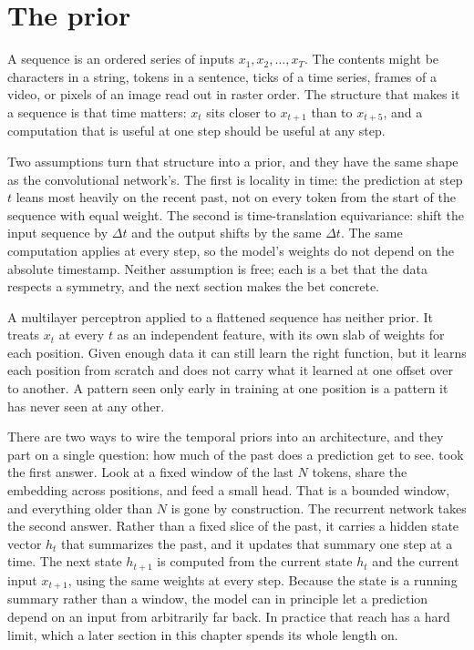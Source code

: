 
\section{The prior}\label{sec:rnn-prior}

A sequence is an ordered series of inputs $x_1, x_2, \ldots, x_T$. The
contents might be characters in a string, tokens in a sentence, ticks of a
time series, frames of a video, or pixels of an image read out in raster
order. The structure that makes it a sequence is that time matters: $x_t$
sits closer to $x_{t+1}$ than to $x_{t+5}$, and a computation that is useful
at one step should be useful at any step.

Two assumptions turn that structure into a prior, and they have the same
shape as the convolutional network's. The first is locality in time: the
prediction at step $t$ leans most heavily on the recent past, not on every
token from the start of the sequence with equal weight. The second is
time-translation equivariance: shift the input sequence by $\Delta t$ and
the output shifts by the same $\Delta t$. The same computation applies at
every step, so the model's weights do not depend on the absolute timestamp.
Neither assumption is free; each is a bet that the data respects a symmetry,
and the next section makes the bet concrete.

A multilayer perceptron applied to a flattened sequence has neither prior.
It treats $x_t$ at every $t$ as an independent feature, with its own slab of
weights for each position. Given enough data it can still learn the right
function, but it learns each position from scratch and does not carry what
it learned at one offset over to another. A pattern seen only early in
training at one position is a pattern it has never seen at any other.

There are two ways to wire the temporal priors into an architecture, and
they part on a single question: how much of the past does a prediction get
to see.  took the first answer. Look at a fixed
window of the last $N$ tokens, share the embedding across positions, and
feed a small head. That is a bounded window, and everything older than $N$
is gone by construction. The recurrent network takes the second answer.
Rather than a fixed slice of the past, it carries a hidden state vector
$h_t$ that summarizes the past, and it updates that summary one step at a
time. The next state $h_{t+1}$ is computed from the current state $h_t$ and
the current input $x_{t+1}$, using the same weights at every step. Because
the state is a running summary rather than a window, the model can in
principle let a prediction depend on an input from arbitrarily far back. In
practice that reach has a hard limit, which a later section in this chapter
spends its whole length on.

